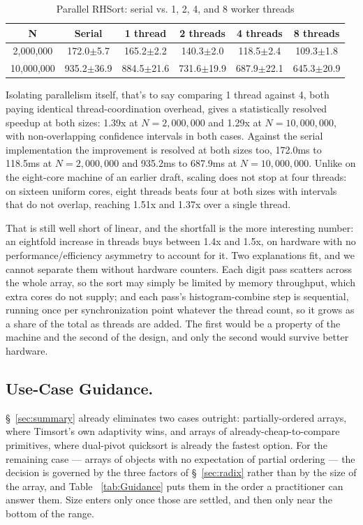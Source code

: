 \documentclass[twoside,leqno,twocolumn]{article}
\begin{document}
\begin{table}
  \caption{Parallel RHSort:
serial vs. 1, 2, 4, and 8 worker threads}
  \label{tab:ParallelRadix}
  \begin{tabular}{cccccc}
    \toprule
    N & Serial & 1 thread & 2 threads & 4 threads & 8 threads \\
    \midrule
    2,000,000 & 172.0$\pm$5.7 & 165.2$\pm$2.2 & 140.3$\pm$2.0 & 118.5$\pm$2.4 & 109.3$\pm$1.8 \\
    10,000,000 & 935.2$\pm$36.9 & 884.5$\pm$21.6 & 731.6$\pm$19.9 & 687.9$\pm$22.1 & 645.3$\pm$20.9 \\
    \bottomrule
  \end{tabular}
\end{table}

Isolating parallelism itself, that's to say comparing 1 thread against 4, both paying identical thread-coordination overhead,
gives a statistically resolved speedup at both sizes: 1.39x at $N=2{,}000{,}000$ and 1.29x at $N=10{,}000{,}000$,
with non-overlapping confidence intervals in both cases.
Against the serial implementation the improvement is resolved at both sizes too,
172.0ms to 118.5ms at $N=2{,}000{,}000$ and 935.2ms to 687.9ms at $N=10{,}000{,}000$.
Unlike on the eight-core machine of an earlier draft, scaling does not stop at four threads:
on sixteen uniform cores, eight threads beats four at both sizes with intervals that do not overlap,
reaching 1.51x and 1.37x over a single thread.

That is still well short of linear, and the shortfall is the more interesting number:
an eightfold increase in threads buys between 1.4x and 1.5x,
on hardware with no performance/efficiency asymmetry to account for it.
Two explanations fit, and we cannot separate them without hardware counters.
Each digit pass scatters across the whole array, so the sort may simply be limited by memory throughput,
which extra cores do not supply; and each pass's histogram-combine step is sequential,
running once per synchronization point whatever the thread count,
so it grows as a share of the total as threads are added.
The first would be a property of the machine and the second of the design,
and only the second would survive better hardware.

\subsection{Use-Case Guidance.}
\label{sec:usecase}

\S~\ref{sec:summary} already eliminates two cases outright:
partially-ordered arrays, where Timsort's own adaptivity wins, and arrays of already-cheap-to-compare primitives,
where dual-pivot quicksort is already the fastest option.
For the remaining case — arrays of objects with no expectation of partial ordering —
the decision is governed by the three factors of \S~\ref{sec:radix}
rather than by the size of the array,
and Table ~\ref{tab:Guidance} puts them in the order a practitioner can answer them.
Size enters only once those are settled, and then only near the bottom of the range.
\end{document}

